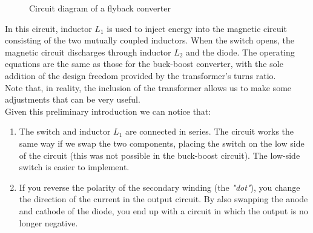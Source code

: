 \documentclass[../main.tex]{subfiles}
\begin{document}
\begin{figure}[h!]
\begin{center}




\caption{Circuit diagram of a flyback converter}
\label{flydiag}	
\end{center}	
\end{figure}


In this circuit, inductor $L_1$ is used to inject energy into the magnetic circuit consisting of the two mutually coupled inductors. 
When the switch opens, the magnetic circuit discharges through inductor $L_2$ and the diode. The operating equations are the same as those for the buck-boost converter, with the sole addition of the design freedom provided by the transformer’s turns ratio.\\

Note that, in reality, the inclusion of the transformer allows us to make some adjustments that can be very useful.\\

Given this preliminary introduction we can notice that:

\begin{enumerate}[label=\textbf{-}]
	\item The switch and inductor $L_1$ are connected in series. The circuit works the same way if we swap the two components, placing the switch on the low side of the circuit (this was not possible in the buck-boost circuit). The low-side switch is easier to implement.
	\item If you reverse the polarity of the secondary winding (the \textit{"dot"}), you change the direction of the current in the output circuit. By also swapping the anode and cathode of the diode, you end up with a circuit in which the output is no longer negative.
\end{enumerate}
\end{document}
